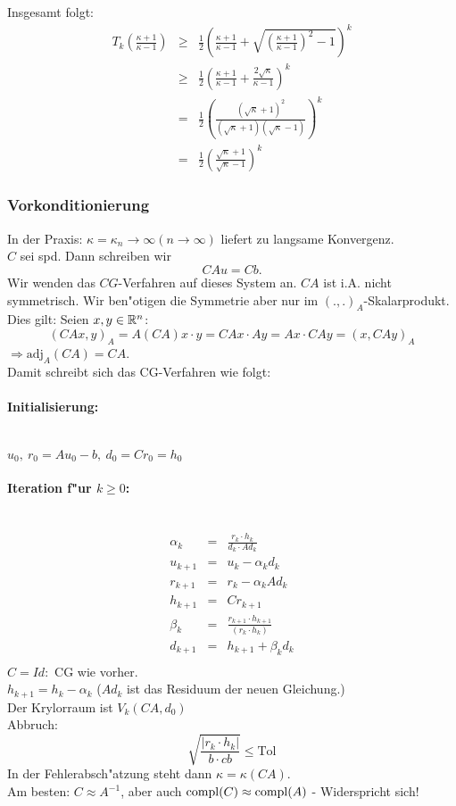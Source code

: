 \documentclass{scrartcl}
\begin{document}
\begin{Bew}
Insgesamt folgt:
\begin{eqnarray*}
T_k \left( \frac{\kappa + 1}{\kappa - 1} \right) & \geq & \frac12 \left( \frac{ \kappa + 1}{\kappa -1} + \sqrt{ \left( \frac{\kappa + 1}{\kappa - 1 } \right)^2 - 1 } \right)^k \\
& \geq & \frac12 \left( \frac{\kappa + 1}{\kappa - 1} + \frac{2 \sqrt{\kappa}}{\kappa - 1} \right)^k \\
& = & \frac12 \left( \frac{ ( \sqrt{\kappa} + 1)^2 }{ (\sqrt{\kappa} + 1)( \sqrt{\kappa} -1 )} \right)^k \\
& = & \frac12 \left( \frac{ \sqrt{\kappa} + 1}{\sqrt{\kappa} - 1} \right)^k
\end{eqnarray*}
\end{Bew}

\subsubsection{Vorkonditionierung}
In der Praxis: $\kappa = \kappa_n \rightarrow \infty (n \rightarrow \infty)$ liefert zu langsame Konvergenz. \\
$C$ sei spd. Dann schreiben wir
$$CAu = Cb.$$
Wir wenden das $CG$-Verfahren auf dieses System an. $CA$ ist i.A. nicht symmetrisch. Wir ben"otigen die Symmetrie aber nur im $(.,.)_A$-Skalarprodukt. Dies gilt: Seien $x,y \in \mathbb{R}^n$:
$$ (CAx, y)_A = A(CA)x \cdot y = CAx \cdot Ay = Ax \cdot CAy = (x, CAy)_A$$
$\Rightarrow \mathrm{adj}_A( CA) = CA$. \\
Damit schreibt sich das CG-Verfahren wie folgt:
\paragraph*{Initialisierung:} \ \\
$u_0, \ r_0 = Au_0 - b, \ d_0 = Cr_0 = h_0$ 
\paragraph*{Iteration f"ur $k\geq 0$:} \ \\
\begin{eqnarray*}
\alpha_k & = & \frac{r_k \cdot h_k}{d_k \cdot A d_k} \\
u_{k+1} & = & u_k - \alpha_k d_k \\
r_{k+1} & = & r_k - \alpha_k A d_k \\
h_{k+1} & = & C r_{k+1} \\
\beta_k & = & \frac{r_{k+1} \cdot h_{k+1}}{(r_k \cdot h_k)} \\
d_{k+1} & = & h_{k+1} + \beta_k d_k \\
\end{eqnarray*}
$C = Id:$ CG wie vorher. \\
$h_{k+1} = h_k - \alpha_k$ ($Ad_k$ ist das Residuum der neuen Gleichung.) \\
Der Krylorraum ist $V_k(CA, d_0)$ \\
Abbruch:
$$\sqrt{\frac{ \vert r_k \cdot h_k \vert }{b \cdot c b} } \leq \mathrm{Tol}$$
In der Fehlerabsch"atzung steht dann $\kappa = \kappa(CA)$. \\
Am besten: $C \approx A^{-1}$, aber auch $\mathrm{compl}(C) \approx \mathrm{compl}(A)$ - Widerspricht sich!
\end{document}
